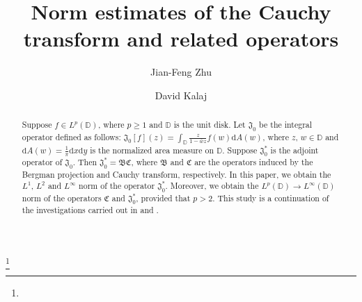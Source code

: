 \documentclass[a4paper,12pt]{amsart}
\theoremstyle{definition}
\numberwithin{equation}{section}
\begin{document}


\title{Norm estimates of the Cauchy transform and related operators}

\author{Jian-Feng Zhu}
\address{Jian-Feng Zhu, School of Mathematical Sciences,
Huaqiao University,
Quanzhou 362021, People's Republic of China and Department of Mathematics,
Shantou University, Shantou, Guangdong 515063, People's Republic of China.
} 

\author{David Kalaj}
\address{David Kalaj, University of Montenegro, Faculty of Natural Sciences and
Mathematics, Cetinjski put b.b. 81000 Podgorica, Montenegro}


\date{}

\begin{abstract}
Suppose $f\in L^p(\mathbb{D})$, where $p\geq1$ and $\mathbb{D}$ is the unit disk.
Let $\mathfrak{J}_0$ be the integral operator defined as follows:
$\mathfrak{J}_0[f](z)=\int_{\mathbb{D}}\frac{z}{1-\bar{w}z}f(w)\mathrm{d}A(w)$, where $z$, $w\in\mathbb{D}$ and $\mathrm{d}A(w)=\frac{1}{\pi}\mathrm{d}x\mathrm{d}y$ is the normalized area measure on $\mathbb{D}$.
Suppose $\mathfrak{J}_0^*$ is the adjoint operator of $\mathfrak{J}_0$. Then $\mathfrak{J}^*_0=\mathfrak{B}\mathfrak{C}$, where $\mathfrak{B}$ and $\mathfrak{C}$ are the operators induced by the Bergman projection and Cauchy transform, respectively.
In this paper, we obtain the $L^1$, $L^2$ and $L^{\infty}$ norm of the operator $\mathfrak{J}_0^*$.
Moreover, we obtain the $L^p(\mathbb{D})\rightarrow L^\infty(\mathbb{D})$ norm of the operators $\mathfrak{C}$ and $\mathfrak{J}_0^*$, provided that $p>2$.
This study is a continuation of the investigations carried out in \cite{Baranov} and \cite{kalaj1}.
\end{abstract}
\thanks{}

\maketitle \pagestyle{myheadings} 

\end{document}
